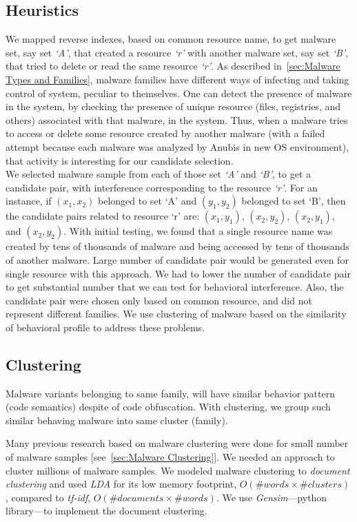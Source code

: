 \subsection{Heuristics}
\label{sub:Heuristics}
We mapped reverse indexes, based on common resource name, to get malware set, say set \emph{`A'}, that created a resource \emph{`r'} with another malware set, say set \emph{`B'}, that tried to delete or read the same resource \emph{`r'}.
As described in~\autoref{sec:Malware Types and Families}, malware families have different ways of infecting and taking control of system, peculiar to themselves.
One can detect the presence of malware in the system, by checking the presence of unique resource (files, registries, and others) associated with that malware, in the system.
Thus, when a malware tries to access or delete some resource created by another malware (with a failed attempt because each malware was analyzed by Anubis in new OS environment), that activity is interesting for our candidate selection.\\

We selected malware sample from each of those set \emph{`A'} and \emph{`B'}, to get a candidate pair, with interference corresponding to the resource \emph{`r'}.
For an instance, if $(x_1,x_2)$ belonged to set `A' and $(y_1,y_2)$ belonged to set `B', then the candidate pairs related to resource `r' are: $(x_1,y_1)$, $(x_2,y_2)$, $(x_2,y_1)$, and $(x_2,y_2)$.
With initial testing, we found that a single resource name was created by tens of thousands of malware and being accessed by tens of thousands of another malware.
Large number of candidate pair would be generated even for single resource with this approach.
We had to lower the number of candidate pair to get substantial number that we can test for behavioral interference.
Also, the candidate pair were chosen only based on common resource, and did not represent different families.
We use clustering of malware based on the similarity of behavioral profile to address these problems.
\subsection{Clustering}
\label{sub:Clustering}
Malware variants belonging to same family, will have similar behavior pattern (code semantics) despite of code obfuscation.
With clustering, we group such similar behaving malware into same cluster (family).

Many previous research based on malware clustering were done for small number of malware samples [see~\autoref{sec:Malware Clustering}].
We needed an approach to cluster millions of malware samples.
We modeled malware clustering to \emph{document clustering} and used \emph{LDA} for its low memory footprint, $O(\#words\times \#clusters)$, compared to \emph{tf-idf}, $O(\#documents \times \#words)$.
We use \emph{Gensim}---python library---to implement the document clustering.
